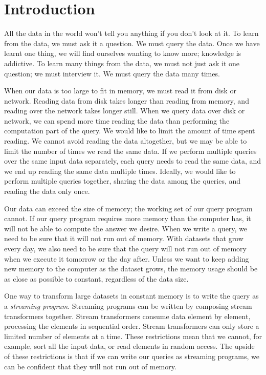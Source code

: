 \chapter{Introduction}
\label{chapter:introduction}

All the data in the world won't tell you anything if you don't look at it.
To learn from the data, we must ask it a question.
We must query the data.
Once we have learnt one thing, we will find ourselves wanting to know more; knowledge is addictive.
To learn many things from the data, we must not just ask it one question; we must interview it.
We must query the data many times.

When our data is too large to fit in memory, we must read it from disk or network.
Reading data from disk takes longer than reading from memory, and reading over the network takes longer still.
When we query data over disk or network, we can spend more time reading the data than performing the computation part of the query.
We would like to limit the amount of time spent reading.
We cannot avoid reading the data altogether, but we may be able to limit the number of times we read the same data.
If we perform multiple queries over the same input data separately, each query needs to read the same data, and we end up reading the same data multiple times.
Ideally, we would like to perform multiple queries together, sharing the data among the queries, and reading the data only once.

Our data can exceed the size of memory; the working set of our query program cannot.
If our query program requires more memory than the computer has, it will not be able to compute the answer we desire.
When we write a query, we need to be sure that it will not run out of memory.
With datasets that grow every day, we also need to be sure that the query will not run out of memory when we execute it tomorrow or the day after.
Unless we want to keep adding new memory to the computer as the dataset grows, the memory usage should be as close as possible to constant, regardless of the data size.

One way to transform large datasets in constant memory is to write the query as a \emph{streaming program}.
Streaming programs can be written by composing stream transformers together.
Stream transformers consume data element by element, processing the elements in sequential order.
Stream transformers can only store a limited number of elements at a time.
These restrictions mean that we cannot, for example, sort all the input data, or read elements in random access.
The upside of these restrictions is that if we can write our queries as streaming programs, we can be confident that they will not run out of memory.

